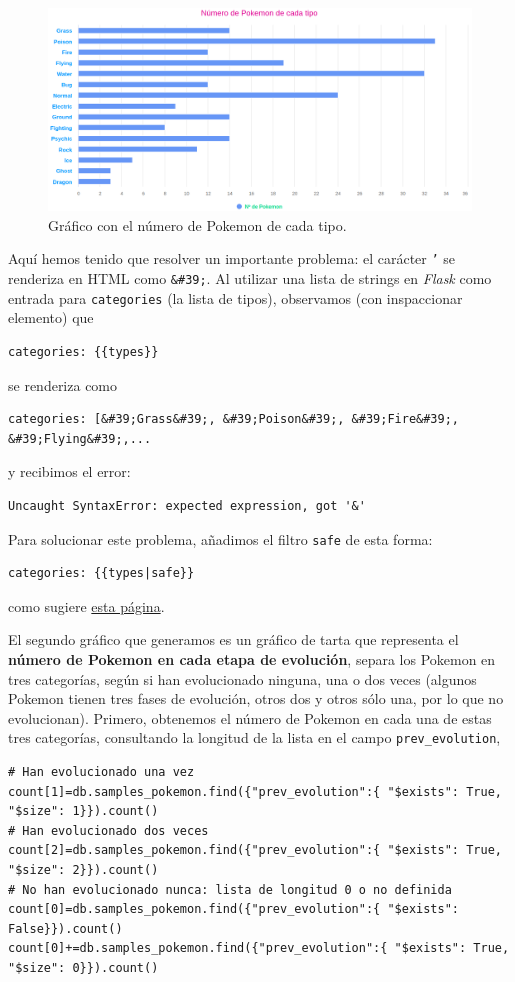 \documentclass{article}
\begin{document}
\begin{figure}[H]
  \centering
  \includegraphics[width=190mm]{imgs/stats-type}
  \caption{Gráfico con el número de Pokemon de cada tipo.}
  \label{fig:stats-type}
\end{figure}

Aquí hemos tenido que resolver un importante problema: el carácter
\texttt{'} se renderiza en HTML como \texttt{\&\#39;}. Al utilizar una
lista de strings en \textit{Flask} como entrada para \texttt{categories} (la
lista de tipos), observamos (con inspaccionar elemento) que
\begin{verbatim}
categories: {{types}}
\end{verbatim}
se renderiza como
\begin{verbatim}
categories: [&#39;Grass&#39;, &#39;Poison&#39;, &#39;Fire&#39;, &#39;Flying&#39;,...
\end{verbatim}
y recibimos el error:
\begin{verbatim}
Uncaught SyntaxError: expected expression, got '&'
\end{verbatim}
Para solucionar este problema, añadimos el filtro \texttt{safe} de esta forma: 
\begin{verbatim}
categories: {{types|safe}}
\end{verbatim}
como sugiere \href{https://stackoverflow.com/questions/20026975/using-a-flask-variable-as-data-source-for-highcharts}{esta página}.

El segundo gráfico que generamos es un gráfico de tarta que representa
el \textbf{número de Pokemon en cada etapa de evolución}, separa los
Pokemon en tres categorías, según si han evolucionado ninguna, una o
dos veces (algunos Pokemon tienen tres fases de evolución, otros dos y
otros sólo una, por lo que no evolucionan). Primero, obtenemos el
número de Pokemon en cada una de estas tres categorías, consultando la
longitud de la lista en el campo \texttt{prev\_evolution},
\begin{verbatim}
# Han evolucionado una vez
count[1]=db.samples_pokemon.find({"prev_evolution":{ "$exists": True, "$size": 1}}).count()
# Han evolucionado dos veces
count[2]=db.samples_pokemon.find({"prev_evolution":{ "$exists": True, "$size": 2}}).count()
# No han evolucionado nunca: lista de longitud 0 o no definida
count[0]=db.samples_pokemon.find({"prev_evolution":{ "$exists": False}}).count()
count[0]+=db.samples_pokemon.find({"prev_evolution":{ "$exists": True, "$size": 0}}).count()
\end{verbatim}
\end{document}
